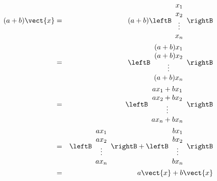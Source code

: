 \begin{solution}
\begin{itemize}
\begin{eqnarray*} 
(a+b)\vect{x} &=& 
(a+b) \leftB \begin{array}{c}
x_1 \\
x_2 \\
\vdots \\
x_n
\end{array}
\rightB
\\
&=& 
\leftB \begin{array}{c}
(a+b)x_1 \\
(a+b)x_2 \\
\vdots \\
(a+b)x_n
\end{array}
\rightB \\
&=&
\leftB \begin{array}{c}
ax_1 +bx_1 \\
ax_2 +bx_2\\
\vdots \\
ax_n +bx_n
\end{array}
\rightB \\
&=&
\leftB \begin{array}{c}
ax_1 \\
ax_2 \\
\vdots \\
ax_n
\end{array}
\rightB +
\leftB \begin{array}{c}
bx_1 \\
bx_2 \\
\vdots \\
bx_n
\end{array}
\rightB \\
&=& a\vect{x} + b\vect{x}
\end{eqnarray*}


\end{itemize}
\end{solution}
